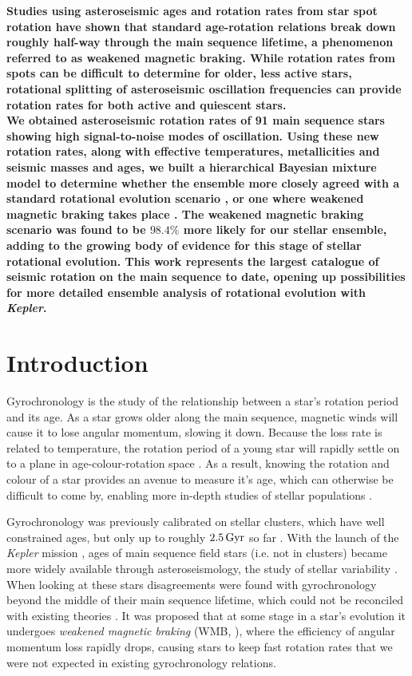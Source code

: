\documentclass[12pt]{article}
\begin{document}
\textbf{Studies using asteroseismic ages and rotation rates from star spot rotation have shown that standard age-rotation relations break down roughly half-way through the main sequence lifetime, a phenomenon referred to as weakened magnetic braking. While rotation rates from spots can be difficult to determine for older, less active stars, rotational splitting of asteroseismic oscillation frequencies can provide rotation rates for both active and quiescent stars.\\
We obtained asteroseismic rotation rates of 91 main sequence stars showing high signal-to-noise modes of oscillation.
Using these new rotation rates, along with effective temperatures, metallicities and seismic masses and ages, we built a hierarchical Bayesian mixture model to determine whether the ensemble more closely agreed with a standard rotational evolution scenario \cite{vansaders+pinsonneault2013}, or one where weakened magnetic braking takes place \cite{vansaders+2016}. The weakened magnetic braking scenario was found to be $98.4\%$ more likely for our stellar ensemble, adding to the growing body of evidence for this stage of stellar rotational evolution. This work represents the largest catalogue of seismic rotation on the main sequence to date, opening up possibilities for more detailed ensemble analysis of rotational evolution with \textit{Kepler}.}

\section{Introduction} %
Gyrochronology is the study of the relationship between a star's rotation period and its age. As a star grows older along the main sequence, magnetic winds will cause it to lose angular momentum, slowing it down. Because the loss rate is related to temperature, the rotation period of a young star will rapidly settle on to a plane in age-colour-rotation space \cite{barnes2007}. As a result, knowing the rotation and colour of a star provides an avenue to measure it's age, which can otherwise be difficult to come by, enabling more in-depth studies of stellar populations \cite{leiner+2019,claytor+2019}.

Gyrochronology was previously calibrated on stellar clusters, which have well constrained ages, but only up to roughly $2.5\, \rm{Gyr}$ so far \cite{meibom+2015}. With the launch of the \textit{Kepler} mission \cite{borucki+2010}, ages of main sequence field stars (i.e. not in clusters) became more widely available through asteroseismology, the study of stellar variability \cite{silvaaguirre+2015}. When looking at these stars disagreements were found with gyrochronology beyond the middle of their main sequence lifetime, which could not be reconciled with existing theories \cite{angus+2015, nielsen+2015, davies+2015}. It was proposed that at some stage in a star's evolution it undergoes \textit{weakened magnetic braking} (WMB, \cite{vansaders+2016}), where the efficiency of angular momentum loss rapidly drops, causing stars to keep fast rotation rates that we were not expected in existing gyrochronology relations.
\end{document}
